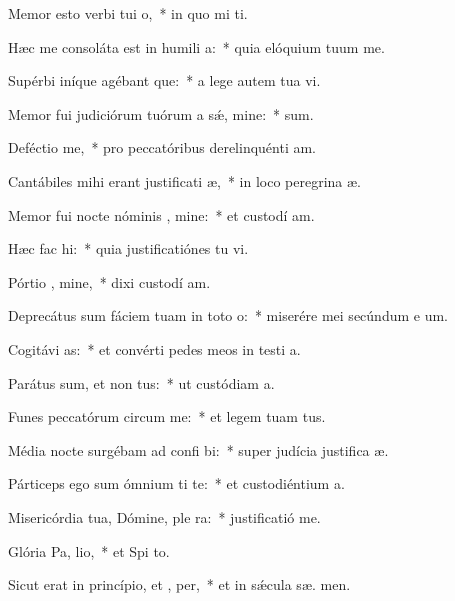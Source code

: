 \item Memor esto verbi tui  o,~* in quo mi  ti.
\item Hæc me consoláta est in humili a:~* quia elóquium tuum  me.
\item Supérbi iníque agébant que:~* a lege autem tua  vi.
\item Memor fui judiciórum tuórum a sǽ, mine:~*   sum.
\item Deféctio  me,~* pro peccatóribus derelinquénti  am.
\item Cantábiles mihi erant justificati æ,~* in loco peregrina æ.
\item Memor fui nocte nóminis , mine:~* et custodí  am.
\item Hæc fac  hi:~* quia justificatiónes tu vi.
\item Pórtio , mine,~* dixi custodí  am.
\item Deprecátus sum fáciem tuam in toto  o:~* miserére mei secúndum e um.
\item Cogitávi  as:~* et convérti pedes meos in testi a.
\item Parátus sum, et non  tus:~* ut custódiam  a.
\item Funes peccatórum circum  me:~* et legem tuam   tus.
\item Média nocte surgébam ad confi bi:~* super judícia justifica æ.
\item Párticeps ego sum ómnium ti te:~* et custodiéntium  a.
\item Misericórdia tua, Dómine, ple  ra:~* justificatió   me.
\item Glória Pa,  lio,~* et Spi to.
\item Sicut erat in princípio, et ,  per,~* et in sǽcula sæ. men.
